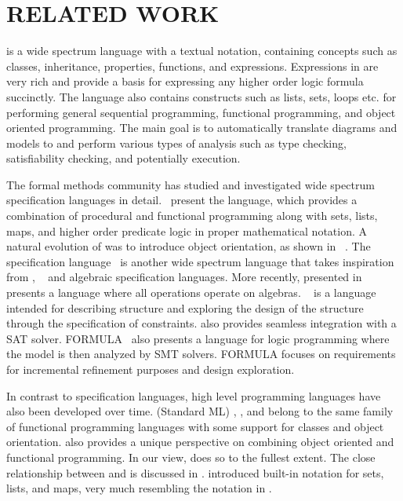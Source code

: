 \section{RELATED WORK}
\label{sec:related-work}

\Klang{} is a wide spectrum language with a textual notation, 
containing concepts such
as classes, inheritance, properties, functions, and
expressions. Expressions in \Klang{} are very rich and provide a basis
for expressing any higher order logic formula succinctly. The language
also contains constructs such as lists, sets, loops etc. for
performing general sequential programming, functional programming, and
object oriented programming. The main goal is to automatically
translate \sysml{} diagrams and models to \Klang{} and perform various
types of analysis such as type checking, satisfiability checking, and
potentially execution.

The formal methods community has studied and investigated wide
spectrum specification languages in
detail.~\cite{vdm78,bjoerner-jones-82,jones90,jones-shaw-90} present
the \vdm{} language, which provides a combination of procedural and
functional programming along with sets, lists, maps, and higher order
predicate logic in proper mathematical notation. A natural evolution
of \vdm{} was to introduce object orientation, as shown in
\vdmpp{}~\cite{vdmplusplus05}. The \raiselang{} specification
language~\cite{raise92} is another wide spectrum language that takes
inspiration from \vdm{}, \zlang{}~\cite{spivey-Z-1988} and algebraic
specification languages. More recently, \asml{} presented
in~\cite{asml05} presents a language where all operations operate on
algebras. \alloy{}~\cite{jackson-alloy-12} is a language intended for
describing structure and exploring the design of the structure through
the specification of constraints. \alloy{} also provides seamless
integration with a SAT solver. FORMULA~\cite{jackson2009specifying}
also presents a language for logic programming where the model is then
analyzed by SMT solvers. FORMULA focuses on requirements for
incremental refinement purposes and design exploration.

In contrast to specification languages, high level programming
languages have also been developed over time. \sml{} (Standard ML)
\cite{standard-ml-97}, \ocaml{} \cite{ocaml}, and \haskell{}
\cite{jones2003haskell} belong to the same family of functional
programming languages with some support for classes and object
orientation. \python{} \cite{python} also provides a unique
perspective on combining object oriented and functional
programming. In our view, \scala{} \cite{scala} does so to the fullest
extent. The close relationship between \scala{} and \vdm{} is
discussed in \cite{havelund-scala-vdm-12}.  \fortress{}
\cite{fortress} introduced built-in notation for sets, lists, and
maps, very much resembling the notation in \vdm{}.

